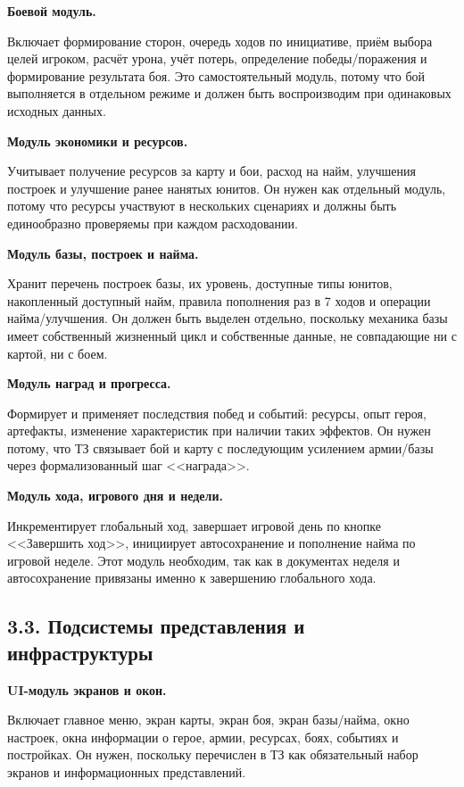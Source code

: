 \documentclass[12pt,a4paper]{article}
\begin{document}
\textbf{Боевой модуль.}

Включает формирование сторон, очередь ходов по инициативе, приём выбора целей игроком, расчёт урона, учёт потерь, определение победы/поражения и формирование результата боя. Это самостоятельный модуль, потому что бой выполняется в отдельном режиме и должен быть воспроизводим при одинаковых исходных данных.

\textbf{Модуль экономики и ресурсов.}

Учитывает получение ресурсов за карту и бои, расход на найм, улучшения построек и улучшение ранее нанятых юнитов. Он нужен как отдельный модуль, потому что ресурсы участвуют в нескольких сценариях и должны быть единообразно проверяемы при каждом расходовании.

\textbf{Модуль базы, построек и найма.}

Хранит перечень построек базы, их уровень, доступные типы юнитов, накопленный доступный найм, правила пополнения раз в 7 ходов и операции найма/улучшения. Он должен быть выделен отдельно, поскольку механика базы имеет собственный жизненный цикл и собственные данные, не совпадающие ни с картой, ни с боем.

\textbf{Модуль наград и прогресса.}

Формирует и применяет последствия побед и событий: ресурсы, опыт героя, артефакты, изменение характеристик при наличии таких эффектов. Он нужен потому, что ТЗ связывает бой и карту с последующим усилением армии/базы через формализованный шаг <<награда>>.

\textbf{Модуль хода, игрового дня и недели.}

Инкрементирует глобальный ход, завершает игровой день по кнопке <<Завершить ход>>, инициирует автосохранение и пополнение найма по игровой неделе. Этот модуль необходим, так как в документах неделя и автосохранение привязаны именно к завершению глобального хода.

\subsection*{3.3. Подсистемы представления и инфраструктуры}

\textbf{UI-модуль экранов и окон.}

Включает главное меню, экран карты, экран боя, экран базы/найма, окно настроек, окна информации о герое, армии, ресурсах, боях, событиях и постройках. Он нужен, поскольку перечислен в ТЗ как обязательный набор экранов и информационных представлений.
\end{document}
